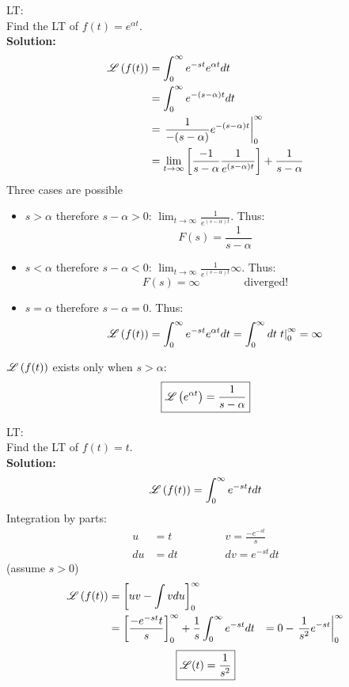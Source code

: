 \begin{exmp}{LT:}\\
Find the LT of $f(t)=e^{\alpha t}$.\\
\textbf{Solution:}
\begin{align*}
\operatorname{\mathscr{L}}\left( f(t) \right) &=\int^\infty_0 e^{-st} e^{\alpha t} dt\\
  & =\int^\infty_0 e^{-(s-\alpha)t}  dt\\
    & =\left. \frac{1}{-(s-\alpha)}e^{-(s-\alpha)t}  \right|^\infty_0\\
    & =\lim_{t\to\infty}\left[\frac{-1}{s-\alpha}\frac{1}{e^{(s-\alpha)t}}\right]+\frac{1}{s-\alpha}
\end{align*}
Three cases are possible
\begin{itemize}
\item $s>\alpha$ therefore $s-\alpha>0$: $\lim_{t\to\infty}\frac{1}{e^{(s-\alpha)t}}$. Thus:
\begin{equation*}
F(s)=\frac{1}{s-\alpha}
\end{equation*}
\item  $s<\alpha$ therefore $s-\alpha<0$: $\lim_{t\to\infty}\frac{1}{e^{(s-\alpha)t}} \infty $. Thus:
\begin{equation*}
F(s)=\infty \qquad \qquad \text{diverged!}
\end{equation*}
\item  $s=\alpha$ therefore $s-\alpha=0$. Thus:
\begin{align*}
\operatorname{\mathscr{L}}\left( f(t) \right)  =\int^\infty_0 e^{-st} e^{\alpha t} dt=\int^\infty_0 dt \left. t\right|^\infty_0=\infty
\end{align*}
\end{itemize}
$\operatorname{\mathscr{L}}\left( f(t) \right) $ exists only when $s>\alpha$:
\begin{align*}
\boxed{\operatorname{\mathscr{L}}\left(  e^{\alpha t} \right) =\frac{1}{s-\alpha}}
\end{align*}
\end{exmp}



\begin{exmp}{LT:}\\
Find the LT of $f(t)=t$.\\
\textbf{Solution:}
\begin{align*}
\operatorname{\mathscr{L}}\left( f(t) \right) &=\int^\infty_0 e^{-st} t dt\\
\end{align*}
Integration by parts:
\begin{align*}
u &=t \qquad \qquad & v=\frac{-e^{-st}}{s}\\
du&=dt & dv=e^{-st} dt
\end{align*}
(assume $s>0$)
\begin{align*}
\operatorname{\mathscr{L}}\left( f(t) \right) &=\left[uv-\int v du\right]^\infty_0\\
&=\left[\frac{-e^{-st} t}{s}\right]^\infty_0+\frac{1}{s}\int^\infty_0 e^{-st}dt
&=0-\left.\frac{1}{s^2}e^{-st}\right|^\infty_0
\end{align*}
\begin{align*}
\boxed{ \operatorname{\mathscr{L}}(t) =\frac{1}{s^2}}
\end{align*}
\end{exmp}
